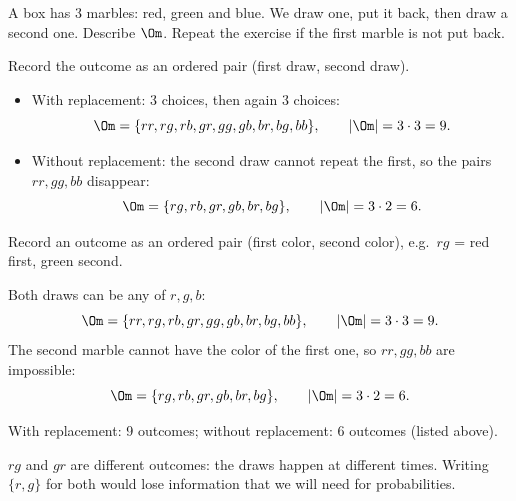
\begin{problem}
	A box has 3 marbles: red, green and blue. We draw one, put it back, then
	draw a second one. Describe $\Om$. Repeat the exercise if the first marble
	is not put back.
\end{problem}

\begin{slides}
	\exstatement
	\pause
	\sol Record the outcome as an ordered pair (first draw, second draw).
	\begin{itemize}
		\item With replacement: 3 choices, then again 3 choices:
		      \[\Om=\{rr,rg,rb,gr,gg,gb,br,bg,bb\},\qquad |\Om|=3\cdot3=9.\]
		\item Without replacement: the second draw cannot repeat the first, so
		      the pairs $rr,gg,bb$ disappear:
		      \[\Om=\{rg,rb,gr,gb,br,bg\},\qquad |\Om|=3\cdot 2=6.\]
	\end{itemize}
\end{slides}

\begin{solution}
	\idea Record an outcome as an ordered pair (first color, second color),
	e.g.\ $rg$ = red first, green second.

	 Both draws can be any of $r,g,b$:
	\[ \Om=\{rr,rg,rb,gr,gg,gb,br,bg,bb\},\qquad|\Om|=3\cdot3=9. \]
	 The second marble cannot have the color of the
	first one, so $rr,gg,bb$ are impossible:
	\[ \Om=\{rg,rb,gr,gb,br,bg\},\qquad|\Om|=3\cdot2=6. \]
	\begin{answer}
		With replacement: 9 outcomes; without replacement: 6 outcomes (listed above).
	\end{answer}
	\begin{remark}
		$rg$ and $gr$ are different outcomes: the draws happen at different
		times. Writing $\{r,g\}$ for both would lose information that we will need
		for probabilities.
	\end{remark}
\end{solution}
